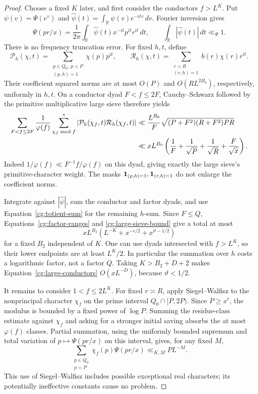 \begin{proof}
Choose a fixed $K$ later, and first consider the conductors
$f>L^K$. Put $\psi(v)=\Psi(e^v)$ and
$\widehat\psi(t)=\int_{\mathbb R}\psi(v)e^{-itv}\,dv$.
Fourier inversion gives
\[
 \Psi(pr/x)=\frac1{2\pi}\int_{\mathbb R}
             \widehat\psi(t)x^{-it}p^{it}r^{it}\,dt,
 \qquad \int_{\mathbb R}|\widehat\psi(t)|\,dt\ll_\Psi1.
\]
There is no frequency truncation error. For fixed $h,t$, define
\[
 \mathcal P_h(\chi,t)=
    \sum_{\substack{p\in Q_0,\ p\asymp P\\(p,h)=1}}\chi(p)p^{it},
 \qquad
 \mathcal R_h(\chi,t)=
    \sum_{\substack{r\asymp R\\(r,h)=1}}b(r)\chi(r)r^{it}.
\]
Their coefficient squared norms are at most $O(P)$ and
$O(RL^{2B_0})$, respectively, uniformly in $h,t$. On a conductor
dyad $F<f\le2F$, Cauchy--Schwarz followed by the primitive
multiplicative large sieve therefore yields
\begin{align}
 \sum_{F<f\le2F}\frac1{\varphi(f)}
       \sum_{\chi_f\bmod f}^{*}
       |\mathcal P_h(\chi_f,t)\mathcal R_h(\chi_f,t)|
 &\ll \frac{L^{B_0}}{F}
       \sqrt{(P+F^2)(R+F^2)PR} \notag\\
 &\ll xL^{B_0}
       \left(\frac1F+\frac1{\sqrt P}+\frac1{\sqrt R}
                        +\frac F{\sqrt x}\right).
       \label{cg:large-sieve-bound}
\end{align}
Indeed $1/\varphi(f)\ll F^{-1}f/\varphi(f)$ on this dyad, giving
exactly the large sieve's primitive-character weight. The masks
$\mathbf{1}_{(p,h)=1},\mathbf{1}_{(r,h)=1}$ do not enlarge the coefficient norms.

Integrate against $|\widehat\psi|$, sum the conductor and factor
dyads, and use Equation~\eqref{cg:totient-sum} for the remaining
$h$-sum. Since $F\le Q$, Equations~\eqref{cg:factor-ranges} and
\eqref{cg:large-sieve-bound} give a total at most
\begin{equation}\label{cg:large-conductors}
 xL^{B_2}
       \left(L^{-K}+x^{-c/2}+x^{\vartheta-1/2}\right)
\end{equation}
for a fixed $B_2$ independent of $K$. One can use dyads intersected
with $f>L^K$, so their lower endpoints are at least $L^K/2$.
In particular the summation over $h$ costs a logarithmic factor,
not a factor $Q$. Taking $K>B_2+D+2$ makes
Equation~\eqref{cg:large-conductors} $O(xL^{-D})$, because
$\vartheta<1/2$.

It remains to consider $1<f\le2L^K$. For fixed $r\asymp R$, apply
Siegel--Walfisz to the nonprincipal character $\chi_f$ on the
prime interval $Q_0\cap[P,2P)$. Since $P\ge x^c$, the modulus is
bounded by a fixed power of $\log P$. Summing the residue-class
estimate against $\chi_f$ and asking for a stronger initial saving
absorbs the at most $\varphi(f)$ classes. Partial summation, using
the uniformly bounded supremum and total variation of
$p\mapsto\Psi(pr/x)$ on this interval, gives, for any fixed $M$,
\begin{equation}\label{cg:small-prime-sum}
 \sum_{\substack{p\in Q_0\\p\asymp P}}
       \chi_f(p)\Psi(pr/x)\ll_{K,M}P L^{-M}.
\end{equation}
This use of Siegel--Walfisz includes possible exceptional real
characters; its potentially ineffective constants cause no problem.


\end{proof}
